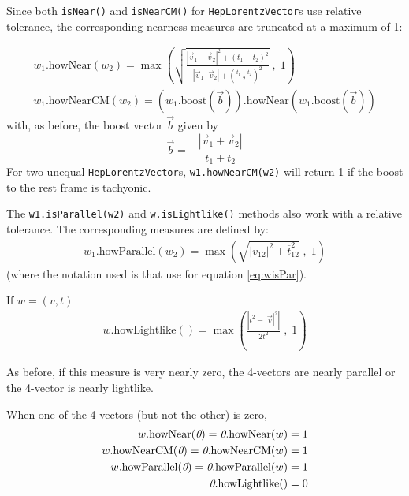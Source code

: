 \documentclass[twoside,12pt]{article}
\def \LV {{\tt HepLorentzVector}}
\begin{document}
Since both {\tt isNear()} and {\tt isNearCM()} for \LV s use relative tolerance,
the corresponding nearness measures are truncated at a maximum of 1:

\begin{eqnarray}
\label{eq:whowNear}
  w_1 \mbox{.howNear} (w_2) = \max \left( \sqrt { \frac
    {\left| \vec{v}_1 - \vec{v}_2 \right| ^2 + (t_1 - t_2)^2 }
    { \left| \vec{v}_1 \cdot \vec{v}_2 \right|
      + \left( \frac{t_1 + t_2}{2} \right)^2 }
  } \;, \; 1 \right)
	\\
\label{eq:whowNearCM}
  w_1 \mbox{.howNearCM} (w_2) =
    \left( w_1\mbox{.boost}(\vec{b}) \right)\mbox{.howNear}
    \left( w_1\mbox{.boost}(\vec{b}) \right)
\end{eqnarray}
\noindent
with, as before, the boost vector $\vec{b}$ given by
\[
  \vec{b} = - \frac { \left| \vec{v}_1 + \vec{v}_2 \right| } { t_1 + t_2 }
\]
\noindent
For two unequal \LV s,
{\tt w1.howNearCM(w2)} will return 1
if the boost to the rest frame is tachyonic.

The {\tt w1.isParallel(w2)}
and {\tt w.isLightlike()}
methods also work with a relative tolerance.
The corresponding measures are defined by:
\begin{eqnarray}
\label{eq:whowPar}
  w_1\mbox{.howParallel}(w_2) = \max \left( \sqrt {
    \left| \overline{v}_{12} \right| ^2 +
	\overline{t}_{12}^2 } \; , \; 1 \right)
\end{eqnarray}
\noindent
(where the notation used is that use for equation \ref{eq:wisPar}).

\noindent
If $w = (v,t)$
\begin{eqnarray}
\label{eq:whowLl}
  w\mbox{.howLightlike}() = \max \left(
    \frac { \left| t^2 - |\vec{v}|^2 \right| } { 2 t^2 }
     \; , \; 1 \right)
\end{eqnarray}

\noindent
As before, if this measure is very nearly zero, the 4-vectors are nearly
parallel or the 4-vector is nearly lightlike.

When one of the 4-vectors (but not the other) is zero,
\begin{eqnarray}
\label{eq:whowNear:2}
  w \mbox{.howNear}(\mbox{{\it 0}}) =
  \mbox{{\it 0}} \mbox{.howNear} (w) = 1
	\\
\label{eq:whowNearCM:2}
  w \mbox{.howNearCM}(\mbox{{\it 0}}) =
  \mbox{{\it 0}} \mbox{.howNearCM} (w) = 1
	\\
\label{eq:whowPar:2}
  w \mbox{.howParallel}(\mbox{{\it 0}}) =
  \mbox{{\it 0}} \mbox{.howParallel} (w) = 1
	\\
\label{eq:whowLl:2}
  \mbox{{\it 0}} \mbox{.howLightlike()} = 0
\end{eqnarray}
\end{document}
